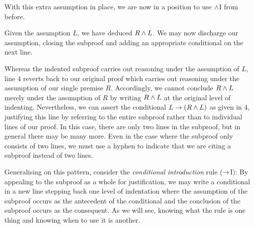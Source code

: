 With this extra assumption in place, we are now in a position to use $\wedge$I from before.
	\begin{fitchproof}
		 \pr{}
		\open
			 
	\end{fitchproof}
Given the assumption $L$, we have deduced $R \wedge L$.
We may now discharge our assumption, closing the subproof and adding an appropriate conditional on the next line.
	\begin{fitchproof}
		 \pr{}
		\open
			 \as{for \eif Intro}{}
			\ai{r, l}
			\close
		\ci{l-rl}
	\end{fitchproof}
Whereas the indented subproof carries out reasoning under the assumption of $L$, line $4$ reverts back to our original proof which carries out reasoning under the assumption of our single premise $R$.
Accordingly, we cannot conclude $R\wedge L$ merely under the assumption of $R$ by writing $R\wedge L$ at the original level of indenting.
Nevertheless, we can assert the conditional $L\rightarrow(R\wedge L)$ as given in $4$, justifying this line by referring to the entire subproof rather than to individual lines of our proof.
In this case, there are only two lines in the subproof, but in general there may be many more.
Even in the case where the subproof only consists of two lines, we must use a hyphen to indicate that we are citing a subproof instead of two lines.

Generalising on this pattern, consider the \textit{conditional introduction} rule ($\rightarrow$I):
\factoidbox{
	\begin{fitchproof}
		\open
			\hypo[i]{a}{\metaA} \as{}
			\have[\vdots]{b}{\vdots}
			\have[k]{c}{\metaB}
		\close
		\have[\ ]{ab}{\metaA\eif\metaB}\ci{a-c}
	\end{fitchproof}}
By appealing to the subproof as a whole for justification, we may write a conditional in a new line stepping back one level of indentation where the assumption of the subproof occurs as the antecedent of the conditional and the conclusion of the subproof occurs as the consequent.
As we will see, knowing what the rule is one thing and knowing when to use it is another.


